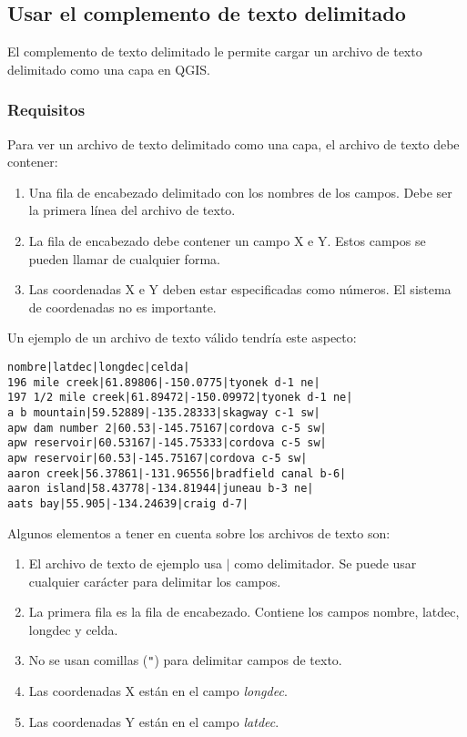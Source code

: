     
\subsection{Usar el complemento de texto delimitado}\label{label_dltext}    

El complemento de texto delimitado le permite cargar un archivo de texto delimitado 
como una capa en QGIS.
    
\subsubsection{Requisitos}

Para ver un archivo de texto delimitado como una capa, el archivo de texto debe contener:

\begin{enumerate}      
\item Una fila de encabezado delimitado con los nombres de los campos. Debe ser la primera 
línea del archivo de texto.
\item La fila de encabezado debe contener un campo X e Y. Estos campos se pueden llamar de 
cualquier forma.
\item Las coordenadas X e Y deben estar especificadas como números. El sistema de coordenadas 
no es importante.
\end{enumerate}

Un ejemplo de un archivo de texto válido tendría este aspecto:

\begin{verbatim} 
nombre|latdec|longdec|celda|
196 mile creek|61.89806|-150.0775|tyonek d-1 ne|
197 1/2 mile creek|61.89472|-150.09972|tyonek d-1 ne|
a b mountain|59.52889|-135.28333|skagway c-1 sw|
apw dam number 2|60.53|-145.75167|cordova c-5 sw|
apw reservoir|60.53167|-145.75333|cordova c-5 sw|
apw reservoir|60.53|-145.75167|cordova c-5 sw|
aaron creek|56.37861|-131.96556|bradfield canal b-6|
aaron island|58.43778|-134.81944|juneau b-3 ne|
aats bay|55.905|-134.24639|craig d-7|
\end{verbatim}


Algunos elementos a tener en cuenta  sobre los archivos de texto son:

\begin{enumerate}        
\item  El archivo de texto de ejemplo usa \mbox{$|$} como delimitador. Se puede usar 
cualquier carácter para delimitar los campos.
\item La primera fila es la fila de encabezado. Contiene los campos nombre, latdec,
longdec y celda.
\item No se usan comillas ({\tt{}"{}}) para delimitar campos de texto.
\item Las coordenadas X están en el campo {\em longdec}.
\item Las coordenadas Y están en el campo  {\em latdec}.
\end{enumerate}

